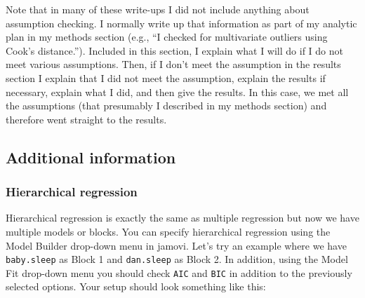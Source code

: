 \documentclass[
]{book}
\begin{document}
Note that in many of these write-ups I did not include anything about assumption checking. I normally write up that information as part of my analytic plan in my methods section (e.g., ``I checked for multivariate outliers using Cook's distance.''). Included in this section, I explain what I will do if I do not meet various assumptions. Then, if I don't meet the assumption in the results section I explain that I did not meet the assumption, explain the results if necessary, explain what I did, and then give the results. In this case, we met all the assumptions (that presumably I described in my methods section) and therefore went straight to the results.

\hypertarget{additional-information-5}{%
\subsection{Additional information}\label{additional-information-5}}

\hypertarget{hierarchical-regression}{%
\subsubsection{Hierarchical regression}\label{hierarchical-regression}}

Hierarchical regression is exactly the same as multiple regression but now we have multiple models or blocks. You can specify hierarchical regression using the Model Builder drop-down menu in jamovi. Let's try an example where we have \texttt{baby.sleep} as Block 1 and \texttt{dan.sleep} as Block 2. In addition, using the Model Fit drop-down menu you should check \texttt{AIC} and \texttt{BIC} in addition to the previously selected options. Your setup should look something like this:
\end{document}
